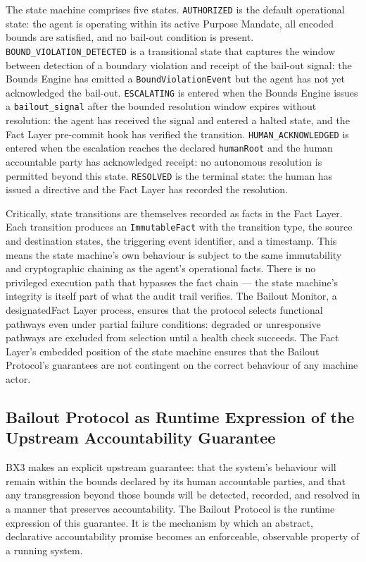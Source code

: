 The state machine comprises five states. \texttt{AUTHORIZED} is the default operational state: the agent is operating within its active Purpose Mandate, all encoded bounds are satisfied, and no bail-out condition is present. \texttt{BOUND\_VIOLATION\_DETECTED} is a transitional state that captures the window between detection of a boundary violation and receipt of the bail-out signal: the Bounds Engine has emitted a \texttt{BoundViolationEvent} but the agent has not yet acknowledged the bail-out. \texttt{ESCALATING} is entered when the Bounds Engine issues a \texttt{bailout\_signal} after the bounded resolution window expires without resolution: the agent has received the signal and entered a halted state, and the Fact Layer pre-commit hook has verified the transition. \texttt{HUMAN\_ACKNOWLEDGED} is entered when the escalation reaches the declared \texttt{humanRoot} and the human accountable party has acknowledged receipt: no autonomous resolution is permitted beyond this state. \texttt{RESOLVED} is the terminal state: the human has issued a directive and the Fact Layer has recorded the resolution.

Critically, state transitions are themselves recorded as facts in the Fact Layer. Each transition produces an \texttt{ImmutableFact} with the transition type, the source and destination states, the triggering event identifier, and a timestamp. This means the state machine's own behaviour is subject to the same immutability and cryptographic chaining as the agent's operational facts. There is no privileged execution path that bypasses the fact chain — the state machine's integrity is itself part of what the audit trail verifies. The Bailout Monitor, a designatedFact Layer process, ensures that the protocol selects functional pathways even under partial failure conditions: degraded or unresponsive pathways are excluded from selection until a health check succeeds. The Fact Layer's embedded position of the state machine ensures that the Bailout Protocol's guarantees are not contingent on the correct behaviour of any machine actor.

\subsection{Bailout Protocol as Runtime Expression of the Upstream Accountability Guarantee}
\label{sec:upstream-guarantee}

BX3 makes an explicit upstream guarantee: that the system's behaviour will remain within the bounds declared by its human accountable parties, and that any transgression beyond those bounds will be detected, recorded, and resolved in a manner that preserves accountability. The Bailout Protocol is the runtime expression of this guarantee. It is the mechanism by which an abstract, declarative accountability promise becomes an enforceable, observable property of a running system.

